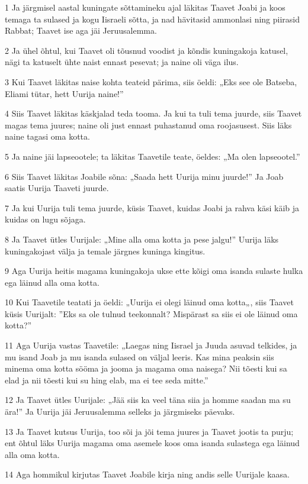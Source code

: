 \par 1 Ja järgmisel aastal kuningate sõttamineku ajal läkitas Taavet Joabi ja koos temaga ta sulased ja kogu Iisraeli sõtta, ja nad hävitasid ammonlasi ning piirasid Rabbat; Taavet ise aga jäi Jeruusalemma.
\par 2 Ja ühel õhtul, kui Taavet oli tõusnud voodist ja kõndis kuningakoja katusel, nägi ta katuselt ühte naist ennast pesevat; ja naine oli väga ilus.
\par 3 Kui Taavet läkitas naise kohta teateid pärima, siis öeldi: „Eks see ole Batseba, Eliami tütar, hett Uurija naine!”
\par 4 Siis Taavet läkitas käskjalad teda tooma. Ja kui ta tuli tema juurde, siis Taavet magas tema juures; naine oli just ennast puhastanud oma roojasusest. Siis läks naine tagasi oma kotta.
\par 5 Ja naine jäi lapseootele; ta läkitas Taavetile teate, öeldes: „Ma olen lapseootel.”
\par 6 Siis Taavet läkitas Joabile sõna: „Saada hett Uurija minu juurde!” Ja Joab saatis Uurija Taaveti juurde.
\par 7 Ja kui Uurija tuli tema juurde, küsis Taavet, kuidas Joabi ja rahva käsi käib ja kuidas on lugu sõjaga.
\par 8 Ja Taavet ütles Uurijale: „Mine alla oma kotta ja pese jalgu!” Uurija läks kuningakojast välja ja temale järgnes kuninga kingitus.
\par 9 Aga Uurija heitis magama kuningakoja ukse ette kõigi oma isanda sulaste hulka ega läinud alla oma kotta.
\par 10 Kui Taavetile teatati ja öeldi: „Uurija ei olegi läinud oma kotta„, siis Taavet küsis Uurijalt: ”Eks sa ole tulnud teekonnalt? Mispärast sa siis ei ole läinud oma kotta?”
\par 11 Aga Uurija vastas Taavetile: „Laegas ning Iisrael ja Juuda asuvad telkides, ja mu isand Joab ja mu isanda sulased on väljal leeris. Kas mina peaksin siis minema oma kotta sööma ja jooma ja magama oma naisega? Nii tõesti kui sa elad ja nii tõesti kui su hing elab, ma ei tee seda mitte.”
\par 12 Ja Taavet ütles Uurijale: „Jää siis ka veel täna siia ja homme saadan ma su ära!” Ja Uurija jäi Jeruusalemma selleks ja järgmiseks päevaks.
\par 13 Ja Taavet kutsus Uurija, too sõi ja jõi tema juures ja Taavet jootis ta purju; ent õhtul läks Uurija magama oma asemele koos oma isanda sulastega ega läinud alla oma kotta.
\par 14 Aga hommikul kirjutas Taavet Joabile kirja ning andis selle Uurijale kaasa.
